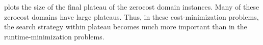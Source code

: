 




 plots the size of the final plateau of the zerocost domain instances.
Many of these zerocost domains have large plateaus.
Thus, in these cost-minimization problems, the search strategy within
plateau becomes much more important than in the
runtime-minimization problems.


